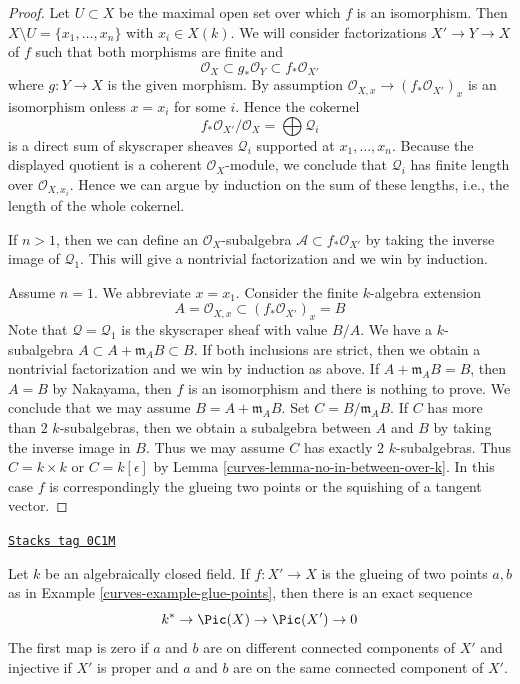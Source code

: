 \begin{proof}

Let $U \subset X$ be the maximal open set over which $f$ is an isomorphism.
Then $X \setminus U = \{x_1, \ldots, x_n\}$ with $x_i \in X(k)$.
We will consider factorizations $X' \to Y \to X$ of $f$ such that
both morphisms are finite and
$$
\mathcal{O}_X \subset g_*\mathcal{O}_Y \subset f_*\mathcal{O}_{X'}
$$
where $g : Y \to X$ is the given morphism. By assumption
$\mathcal{O}_{X, x} \to (f_*\mathcal{O}_{X'})_x$ is an isomorphism
onless $x = x_i$ for some $i$. Hence the cokernel
$$
f_*\mathcal{O}_{X'}/\mathcal{O}_X = \bigoplus \mathcal{Q}_i
$$
is a direct sum of skyscraper sheaves $\mathcal{Q}_i$ supported at
$x_1, \ldots, x_n$.
Because the displayed quotient is a coherent $\mathcal{O}_X$-module,
we conclude that $\mathcal{Q}_i$ has finite length over
$\mathcal{O}_{X, x_i}$. Hence we can argue
by induction on the sum of these lengths, i.e., the length of
the whole cokernel.

\medskip\noindent
If $n > 1$, then we can define an $\mathcal{O}_X$-subalgebra
$\mathcal{A} \subset f_*\mathcal{O}_{X'}$ by taking the inverse
image of $\mathcal{Q}_1$. This will give a nontrivial factorization
and we win by induction.

\medskip\noindent
Assume $n = 1$. We abbreviate $x = x_1$. Consider the finite
$k$-algebra extension
$$
A = \mathcal{O}_{X, x} \subset (f_*\mathcal{O}_{X'})_x = B
$$
Note that $\mathcal{Q} = \mathcal{Q}_1$ is the skyscraper sheaf
with value $B/A$.
We have a $k$-subalgebra $A \subset A + \mathfrak m_A B \subset B$.
If both inclusions are strict, then we obtain a nontrivial
factorization and we win by induction as above.
If $A + \mathfrak m_A B = B$, then $A = B$ by Nakayama, then
$f$ is an isomorphism and there is nothing to prove.
We conclude that we may assume $B = A + \mathfrak m_A B$.
Set $C = B/\mathfrak m_A B$. If $C$ has more than $2$
$k$-subalgebras, then we obtain a subalgebra between $A$
and $B$ by taking the inverse image in $B$. Thus we may
assume $C$ has exactly $2$ $k$-subalgebras. Thus $C = k \times k$
or $C = k[\epsilon]$ by Lemma \ref{curves-lemma-no-in-between-over-k}.
In this case $f$ is correspondingly the glueing two points or the
squishing of a tangent vector.
\end{proof}

\begin{lemma}
\label{curves-lemma-glue-points}
\href{https://stacks.math.columbia.edu/tag/0C1M}{\texttt{Stacks tag 0C1M}}

Let $k$ be an algebraically closed field. If $f : X' \to X$ is the
glueing of two points $a, b$ as in Example \ref{curves-example-glue-points}, then
there is an exact sequence
$$
k^* \to \Pic(X) \to \Pic(X') \to 0
$$
The first map is zero if $a$ and $b$ are on different
connected components of $X'$ and injective
if $X'$ is proper and $a$ and $b$ are on the same connected component of $X'$.
\end{lemma}

